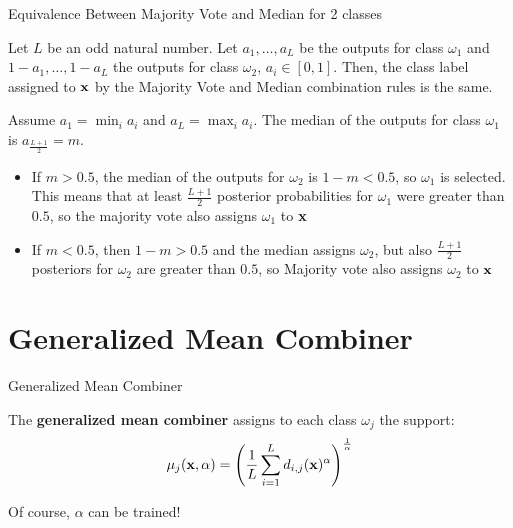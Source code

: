 \documentclass[xcolor=table]{beamer}
\begin{document}
\begin{frame}{Equivalence Between Majority Vote and Median for 2 classes}
    \begin{proposition}
    Let \(L\) be an odd natural number. Let \(a_1,\dots,a_L\) be the outputs for class \(\omega_1\) and \(1-a_1,\dots,1-a_L\) the outputs for class \(\omega_2\), \(a_i\in[0,1]\). Then, the class label assigned to \({\mathbf x}\) by the Majority Vote and Median combination rules is the same.
    \end{proposition}
    \pause
    Assume \(a_1 = \min_i a_i\) and \(a_L = \max_i a_i\). The median of the outputs for class \(\omega_1\) is \(a_{\frac{L+1}{2}} = m\).
    \begin{itemize}
        \item If \(m > 0.5\), the median of the outputs for \(\omega_2\) is \(1- m < 0.5\), so \(\omega_1\) is selected. This means that at least \(\frac{L+1}{2}\) posterior probabilities for \(\omega_1\) were greater than \(0.5\), so the majority vote also assigns \(\omega_1\) to \({\mathbf x}\)
        \item If \(m < 0.5\), then \(1- m > 0.5\) and the median assigns \(\omega_2\), but also \(\frac{L+1}{2}\) posteriors for \(\omega_2\) are greater than \(0.5\), so Majority vote also assigns \(\omega_2\) to \({\mathbf x}\)
    \end{itemize}
\end{frame}

\section{Generalized Mean Combiner}
\begin{frame}{Generalized Mean Combiner}
\begin{definition}
    The \textbf{generalized mean combiner} assigns to each class \(\omega_j\) the support:
    \[
    \mu_j({\mathbf x},\alpha) = \left( \frac{1}{L} \sum_{i=1}^L d_{i,j}({\mathbf x})^\alpha \right)^{\frac{1}{\alpha}}
    \]
\end{definition}

\pause

Of course, \(\alpha\) can be trained! 


\end{frame}
\end{document}
